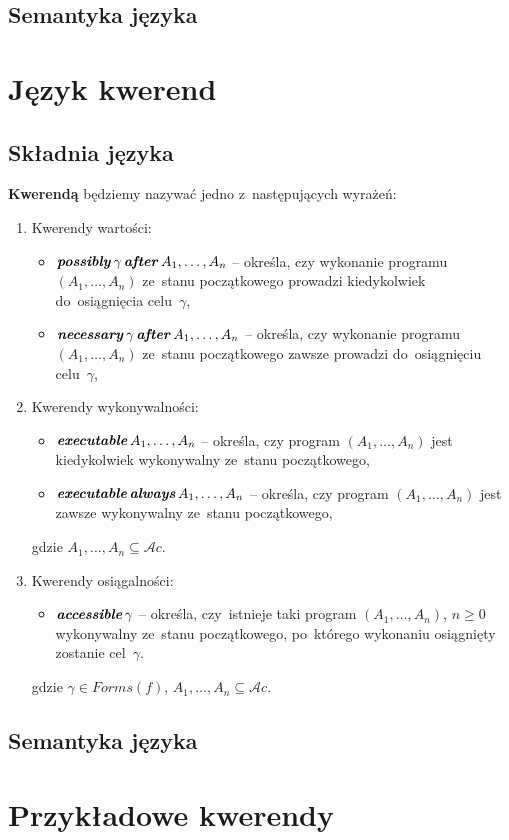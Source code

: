 \documentclass[11pt,a4paper]{article}
\DeclareMathOperator{\After}{\textbf{\textit{after}}}
\DeclareMathOperator{\Always}{\textbf{\textit{always}}}
\DeclareMathOperator{\Executable}{\textbf{\textit{executable}}}
\DeclareMathOperator{\Accessible}{\textbf{\textit{accessible}}}
\DeclareMathOperator{\Possibly}{\textbf{\textit{possibly}}}
\DeclareMathOperator{\Necessary}{\textbf{\textit{necessary}}}
\begin{document}
\subsection{Semantyka języka}





\section{Język kwerend}

\subsection{Składnia języka}

    \textbf{Kwerendą} będziemy nazywać jedno z~następujących wyrażeń:

    \begin{enumerate}
        \item Kwerendy wartości:
        \begin{itemize}            
            \item $\Possibly \gamma \After A_1, \dots, A_n$ -- określa, czy wykonanie programu $(A_1, \dots, A_n)$ ze~stanu początkowego prowadzi kiedykolwiek do~osiągnięcia celu~$\gamma$,
            \item $\Necessary \gamma \After A_1, \dots, A_n$ -- określa, czy wykonanie programu $(A_1, \dots, A_n)$ ze~stanu początkowego zawsze prowadzi do~osiągnięciu celu~$\gamma$,
        \end{itemize}
        \item Kwerendy wykonywalności:
        \begin{itemize}
            \item $\Executable A_1, \dots, A_n$ -- określa, czy program $(A_1, \dots, A_n)$ jest kiedykolwiek wykonywalny ze~stanu początkowego,
            \item $\Executable \Always A_1, \dots, A_n$ -- określa, czy program $(A_1, \dots, A_n)$ jest zawsze wykonywalny ze~stanu początkowego,
        \end{itemize}
        gdzie $A_1, \dots, A_n \subseteq \mathcal{A}c$.
        \item Kwerendy osiągalności:
        \begin{itemize}
            \item $\Accessible \gamma$ -- określa, czy~istnieje taki program $(A_1, \dots, A_n)$, $n \geq 0$ wykonywalny ze~stanu początkowego, po~którego wykonaniu osiągnięty zostanie cel~$\gamma$.
        \end{itemize}
        gdzie $\gamma \in Forms(f)$, $A_1, \dots, A_n \subseteq \mathcal{A}c$.
    \end{enumerate}


\subsection{Semantyka języka}


\section{Przykładowe kwerendy}

\end{document}
